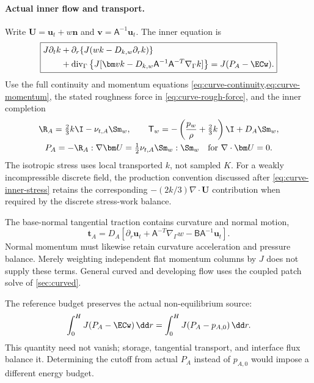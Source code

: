 \paragraph{Actual inner flow and transport.}
Write $\bm U=\bm u_t+w\bm n$ and
$\bm v=\mathsf A^{-1}\bm u_t$. The inner equation is
\begin{equation}
 \boxed{\begin{aligned}
 J\partial_t k
 &+\partial_r\{J(wk-D_{k,w}\partial_rk)\}\\
 &+\operatorname{div}_\Gamma\left\{
 J[\bm v k-D_{k,w}\mathsf A^{-1}\mathsf A^{-T}
                         \nabla_\Gamma k]\right\}
 =J(P_A-\ECw).
 \end{aligned}}
 \label{eq:accepted-curved-k}
\end{equation}
Use the full continuity and momentum equations
\cref{eq:curve-continuity,eq:curve-momentum}, the stated roughness
force in \cref{eq:curve-rough-force}, and the inner completion
\begin{equation}
 \begin{gathered}
 \R_A=\tfrac23k\I-\nu_{t,A}\Sm_w,\qquad
 \mathsf T_w=-\left(\frac{p_w}{\rho}+\tfrac23k\right)\I
              +D_A\Sm_w,\\
 P_A=-\R_A:\nabla\bm U
     =\tfrac12\nu_{t,A}\Sm_w:\Sm_w
 \quad\text{for }\nabla\cdot\bm U=0.
 \end{gathered}
 \label{eq:accepted-curved-stress}
\end{equation}
The isotropic stress uses local transported $k$, not sampled $K$.
For a weakly incompressible discrete field, the production
convention discussed after \cref{eq:curve-inner-stress} retains
the corresponding $-(2k/3)\nabla\cdot\bm U$ contribution when
required by the discrete stress-work balance.

The base-normal tangential traction contains curvature and normal
motion,
\begin{equation}
 \bm t_A=D_A\left[
 \partial_r\bm u_t+\mathsf A^{-T}\nabla_\Gamma w
 -\mathsf B\mathsf A^{-1}\bm u_t\right].
 \label{eq:accepted-curved-traction}
\end{equation}
Normal momentum must likewise retain curvature acceleration and
pressure balance. Merely weighting independent flat momentum
columns by $J$ does not supply these terms. General curved and
developing flow uses the coupled patch solve of \cref{sec:curved}.

The reference budget preserves the actual non-equilibrium source:
\begin{equation}
 \int_0^H J(P_A-\ECw)\,\dd r
 =\int_0^H J(P_A-p_{A,0})\,\dd r.
 \label{eq:accepted-curved-actual-budget}
\end{equation}
This quantity need not vanish; storage, tangential transport, and
interface flux balance it. Determining the cutoff from actual
$P_A$ instead of $p_{A,0}$ would impose a different energy budget.

